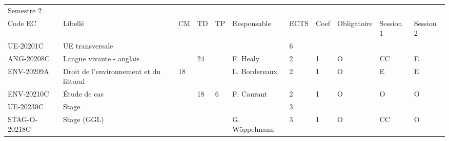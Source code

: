 \documentclass[a4paper,11pt]{article}
\begin{document}
{{\begin{tabular}{lllllllllll}
\rowcolor[HTML]{9B9B9B} 
Semestre 2                         &                                                                                               &    &                            &    &                                    &                           &      &             &                            &                           \\
\rowcolor[HTML]{C0C0C0} 
Code EC                            & Libellé                                                                                       & CM & TD                         & TP & Responsable                        & ECTS                      & Coef & Obligatoire & Session 1                  & Session 2                 \\
\rowcolor[HTML]{EFEFEF} 
UE-20201C                          & UE transversale                                                                               &    &                            &    &                                    & 6                         &      &             &                            &                           \\
ANG-20208C                         & Langue vivante - anglais                                                                      &    & 24                         &    & F. Healy                           & 2                         & 1    & O           & CC                         & E                         \\
\cellcolor[HTML]{FD6864}ENV-20209A & Droit de l'environnement et du littoral                                                       & 18 &                            &    & L. Bordereaux                      & 2                         & 1    & O           & E                          & E                         \\
ENV-20210C                         & \cellcolor[HTML]{FD6864}Étude de cas                                                          &    & 18                         & 6  & \cellcolor[HTML]{FD6864}F. Caurant & 2                         & 1    & O           & O                          & O                         \\
\rowcolor[HTML]{EFEFEF} 
UE-20230C                          & Stage                                                                                         &    &                            &    &                                    & 3                         &      &             &                            &                           \\
STAG-O-20218C                      & \cellcolor[HTML]{FD6864}Stage (GGL)                                                           &    &                            &    & G. Wöppelmann                      & 3                         & 1    & O           & \cellcolor[HTML]{FD6864}CC & \cellcolor[HTML]{FD6864}O \\

\end{tabular}}}
\end{document}
